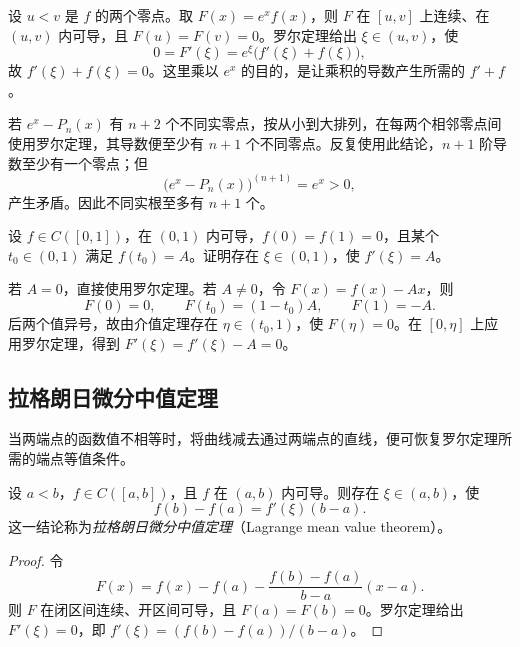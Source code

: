 \documentclass[UTF8,12pt,a4paper,fontset=fandol]{ctexbook}
\begin{document}
\begin{solve}
设 $u<v$ 是 $f$ 的两个零点。取 $F(x)=e^xf(x)$，则 $F$ 在 $[u,v]$ 上连续、在 $(u,v)$ 内可导，且 $F(u)=F(v)=0$。罗尔定理给出 $\xi\in(u,v)$，使
\[
    0=F'(\xi)=e^\xi\bigl(f'(\xi)+f(\xi)\bigr),
\]
故 $f'(\xi)+f(\xi)=0$。这里乘以 $e^x$ 的目的，是让乘积的导数产生所需的 $f'+f$。

若 $e^x-P_n(x)$ 有 $n+2$ 个不同实零点，按从小到大排列，在每两个相邻零点间使用罗尔定理，其导数便至少有 $n+1$ 个不同零点。反复使用此结论，$n+1$ 阶导数至少有一个零点；但
\[
    \bigl(e^x-P_n(x)\bigr)^{(n+1)}=e^x>0,
\]
产生矛盾。因此不同实根至多有 $n+1$ 个。
\end{solve}

\begin{example}
\label{ex:rolle-with-prescribed-interior-value}
设 $f\in C([0,1])$，在 $(0,1)$ 内可导，$f(0)=f(1)=0$，且某个 $t_0\in(0,1)$ 满足 $f(t_0)=A$。证明存在 $\xi\in(0,1)$，使 $f'(\xi)=A$。
\end{example}

\begin{solve}
若 $A=0$，直接使用罗尔定理。若 $A\neq0$，令 $F(x)=f(x)-Ax$，则
\[
    F(0)=0,\qquad F(t_0)=(1-t_0)A,\qquad F(1)=-A.
\]
后两个值异号，故由介值定理存在 $\eta\in(t_0,1)$，使 $F(\eta)=0$。在 $[0,\eta]$ 上应用罗尔定理，得到 $F'(\xi)=f'(\xi)-A=0$。
\end{solve}

\subsection{拉格朗日微分中值定理}
\label{subsec:lagrange-mean-value-theorem}

当两端点的函数值不相等时，将曲线减去通过两端点的直线，便可恢复罗尔定理所需的端点等值条件。

\begin{theorem}[拉格朗日微分中值定理]
\label{thm:lagrange-mean-value}
设 $a<b$，$f\in C([a,b])$，且 $f$ 在 $(a,b)$ 内可导。则存在 $\xi\in(a,b)$，使
\begin{equation}
    f(b)-f(a)=f'(\xi)(b-a).
    \label{eq:lagrange-mean-value}
\end{equation}
这一结论称为\emph{拉格朗日微分中值定理}（Lagrange mean value theorem）。
\end{theorem}

\begin{proof}
令
\[
    F(x)=f(x)-f(a)-\frac{f(b)-f(a)}{b-a}(x-a).
\]
则 $F$ 在闭区间连续、开区间可导，且 $F(a)=F(b)=0$。罗尔定理给出 $F'(\xi)=0$，即 $f'(\xi)=(f(b)-f(a))/(b-a)$。
\end{proof}
\end{document}
